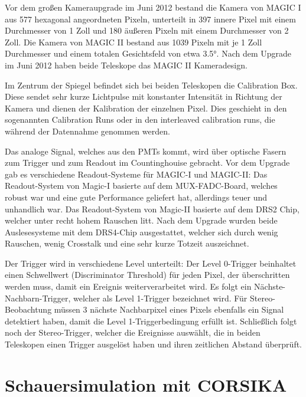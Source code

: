 Vor dem großen Kameraupgrade im Juni 2012 bestand die Kamera von MAGIC I aus 577 hexagonal angeordneten Pixeln, unterteilt in 397 innere Pixel mit einem Durchmesser von 1 Zoll und 180 äußeren Pixeln mit einem Durchmesser von 2 Zoll.
Die Kamera von MAGIC II bestand aus 1039 Pixeln mit je 1 Zoll Durchmesser und einem totalen Gesichtsfeld von etwa 3.5°.
Nach dem Upgrade im Juni 2012 haben beide Teleskope das MAGIC II Kameradesign. \cite{MAGIC-Upgrade}

Im Zentrum der Spiegel befindet sich bei beiden Teleskopen die Calibration Box.
Diese sendet sehr kurze Lichtpulse mit konstanter Intensität in Richtung der Kamera und dienen der Kalibration der einzelnen Pixel.
Dies geschieht in den sogenannten Calibration Runs oder in den interleaved calibration runs, die während der Datennahme genommen werden.

Das analoge Signal, welches aus den PMTs kommt, wird über optische Fasern zum Trigger und zum Readout im Countinghouise gebracht.
Vor dem Upgrade gab es verschiedene Readout-Systeme für MAGIC-I und MAGIC-II:
Das Readout-System von Magic-I basierte auf dem MUX-FADC-Board, welches robust war und eine gute Performance geliefert hat, allerdings teuer und unhandlich war.
Das Readout-System von Magic-II basierte auf dem DRS2 Chip, welcher unter recht hohem Rauschen litt.
Nach dem Upgrade wurden beide Auslesesysteme mit dem DRS4-Chip ausgestattet, welcher sich durch wenig Rauschen, wenig Crosstalk und eine sehr kurze Totzeit auszeichnet.\cite{MAGIC-Upgrade}

Der Trigger wird in verschiedene Level unterteilt:
Der Level 0-Trigger beinhaltet einen Schwellwert (Discriminator Threshold) für jeden Pixel, der überschritten werden muss, damit ein Ereignis weiterverarbeitet wird.
Es folgt ein Nächste-Nachbarn-Trigger, welcher als Level 1-Trigger bezeichnet wird.
Für Stereo-Beobachtung müssen 3 nächste Nachbarpixel eines Pixels ebenfalls ein Signal detektiert haben, damit die Level 1-Triggerbedingung erfüllt ist.\cite{DissMazin}
Schließlich folgt noch der Stereo-Trigger, welcher die Ereignisse auswählt, die in beiden Teleskopen einen Trigger ausgelöst haben und ihren zeitlichen Abstand überprüft.



\section{Schauersimulation mit CORSIKA}
\label{sec:Corsika}

